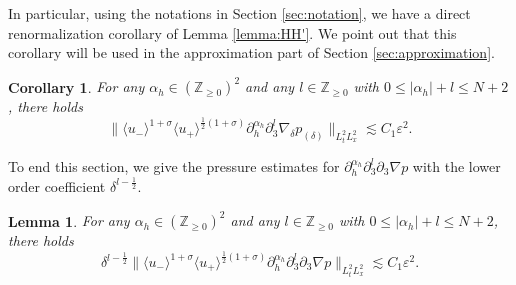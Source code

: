 \documentclass[10pt,reqno]{amsart}
\numberwithin{equation}{section}
\newtheorem{lemma}[theorem]{Lemma}
\newtheorem{corollary}[theorem]{Corollary}
\begin{document}
In particular, using the notations in Section \ref{sec:notation}, we have a direct renormalization corollary of  Lemma \ref{lemma:HH'}. We point out that  this corollary will be used in the approximation part of Section \ref{sec:approximation}.
\begin{corollary}\label{remarkp}
	For any $\alpha_h\in(\mathbb{Z}_{\geqslant 0})^2$ and any $l\in\mathbb{Z}_{\geqslant 0}$ with 
$0\leqslant
|\alpha_h|+l\leqslant N+2$, there holds 
\begin{equation*}
	\big\|\langle u_-\rangle^{1+\sigma}\langle u_+\rangle^{\frac{1}{2}(1+\sigma)}\partial_{h}^{\alpha_h}\partial_3^l \nabla_\delta p_{(\delta)}\big\|_{L^2_tL^2_x}
	\lesssim C_1\varepsilon^2.
\end{equation*}
\end{corollary}

To end this section, we give the pressure estimates for  $\partial_{h}^{\alpha_h}\partial_3^l\partial_3 \nabla p$ with the lower order coefficient $\delta^{l-\frac{1}{2}}$.
\begin{lemma}\label{lemma:HHH}
For any $\alpha_h\in(\mathbb{Z}_{\geqslant 0})^2$ and any $l\in\mathbb{Z}_{\geqslant 0}$ with 
$0\leqslant
|\alpha_h|+l\leqslant N+2$, there holds 
	\begin{equation*}
		\delta^{l-\frac{1}{2}}\big\|\langle u_-\rangle^{1+\sigma}\langle u_+\rangle^{\frac{1}{2}(1+\sigma)}\partial_{h}^{\alpha_h}\partial_3^l\partial_3 \nabla p\big\|_{L^2_tL^2_x}
		\lesssim C_1\varepsilon^2.
	\end{equation*}
\end{lemma}
\end{document}
